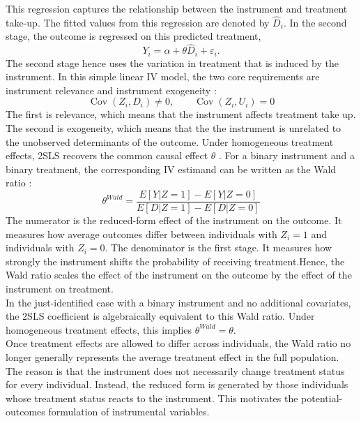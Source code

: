 \documentclass[12pt, a4paper, oneside]{article}
\theoremstyle{plain}
\theoremstyle{definition}
\begin{document}
This regression captures the relationship between the instrument and treatment take-up. The fitted values from this regression are denoted by $\widehat D_i$. In the second stage, the outcome is regressed on this predicted treatment,
\begin{equation}
Y_i = \alpha + \theta \widehat D_i + \varepsilon_i.
\end{equation}
The second stage hence uses the variation in treatment that is induced by the instrument.
In this simple linear IV model, the two core requirements are instrument relevance and instrument exogeneity \citep{wooldridge2016introductory}:
\begin{equation}
\operatorname{Cov}(Z_i, D_i) \neq 0, \qquad \operatorname{Cov}(Z_i, U_i) = 0   
\end{equation}
The first is relevance, which means that the instrument affects treatment take up.
The second is exogeneity, which means that the the instrument is unrelated to the unobserved determinants of the outcome.
Under homogeneous treatment effects, 2SLS recovers the common causal effect $\theta$ \citep{angrist1995identification,angrist1996identification}.
For a binary instrument and a binary treatment, the corresponding IV estimand can be written as the Wald ratio \citep{wald1940fitting}:
\begin{equation}
    \theta^{Wald} = \frac{E[Y|Z=1] - E[Y|Z=0]}{E[D|Z=1] - E[D|Z=0]}
\end{equation}
The numerator is the reduced-form effect of the instrument on the outcome. It measures how average outcomes differ between individuals with $Z_i=1$ and individuals with $Z_i=0$. 
The denominator is the first stage. It measures how strongly the instrument shifts the probability of receiving treatment.Hence, the Wald ratio scales the effect of the instrument on the outcome by the effect of the instrument on treatment.\\
In the just-identified case with a binary instrument and no additional covariates, the 2SLS coefficient is algebraically equivalent to this Wald ratio. Under homogeneous treatment effects, this implies $\theta^{Wald}=\theta$.\\
Once treatment effects are allowed to differ across individuals, the Wald ratio no longer generally represents the average treatment effect in the full population. The reason is that the instrument does not necessarily change treatment status for every individual. Instead, the reduced form is generated by those individuals whose treatment status reacts to the instrument. This motivates the potential-outcomes formulation of instrumental variables.
\end{document}
